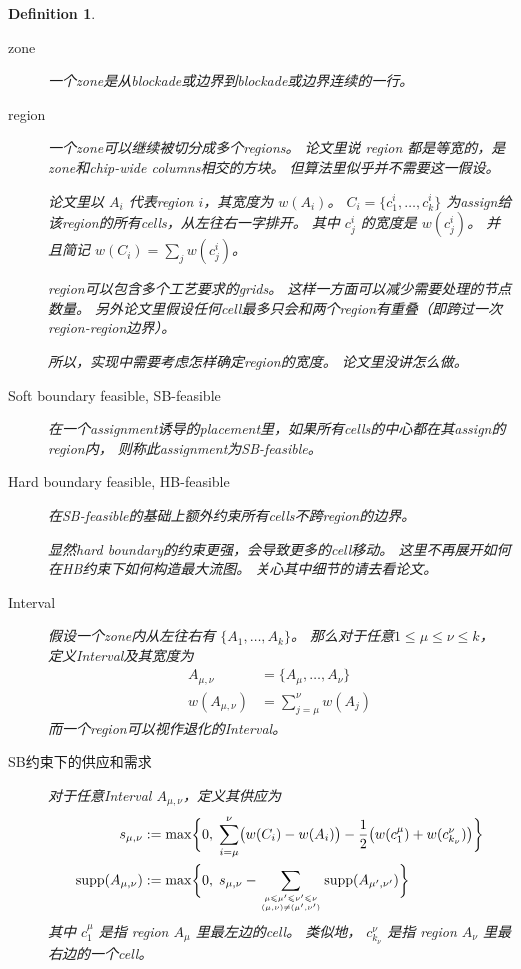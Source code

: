 \documentclass[UTF8,a4paper]{ctexart}
\renewcommand{\leq}{\leqslant}
\newcommand{\supp}[1]{\text{supp} ({#1})}
\renewcommand{\atop}[2]{\genfrac{}{}{0pt}{}{#1}{#2}}
\newtheorem{definition}{Definition}
\begin{document}
\begin{definition}
    \;
    \begin{description}
    \item[zone]
        一个zone是从blockade或边界到blockade或边界连续的一行。
    \item[region]
        一个zone可以继续被切分成多个regions。
        论文里说 region 都是等宽的，是zone和chip-wide columns相交的方块。
        但算法里似乎并不需要这一假设。

        论文里以 $A_i$ 代表region $i$，其宽度为 $w(A_i)$。
        $C_i=\{c^i_1,\dots,c^i_k\}$ 为assign给该region的所有cells，从左往右一字排开。
        其中 $c^i_j$ 的宽度是 $w(c^i_j)$。
        并且简记 $w(C_i)=\sum_j w(c^i_j)$。

        \begin{noteblock}
            region可以包含多个工艺要求的grids。
            这样一方面可以减少需要处理的节点数量。
            另外论文里假设任何cell最多只会和两个region有重叠（即跨过一次region-region边界）。

            所以，实现中需要考虑怎样确定region的宽度。
            论文里没讲怎么做。
        \end{noteblock}
    \item[Soft boundary feasible, SB-feasible]
        在一个assignment诱导的placement里，如果所有cells的中心都在其assign的region内，
        则称此assignment为SB-feasible。
    \item[Hard boundary feasible, HB-feasible]
        在SB-feasible的基础上额外约束所有cells不跨region的边界。

        \begin{noteblock}
            显然hard boundary的约束更强，会导致更多的cell移动。
            这里不再展开如何在HB约束下如何构造最大流图。
            关心其中细节的请去看论文。
        \end{noteblock}
    \item[Interval]
        假设一个zone内从左往右有 $\{A_1,\dots,A_k\}$。
        那么对于任意$1\leq \mu \leq \nu \leq k$，
        定义Interval及其宽度为
        \begin{align*}
            A_{\mu,\nu} &=\{A_\mu,\dots,A_\nu\}\\
            w(A_{\mu,\nu}) &=\sum_{j=\mu}^{\nu} w(A_j)
        \end{align*}
        而一个region可以视作退化的Interval。
    \item[SB约束下的供应和需求]
        对于任意Interval $A_{\mu,\nu}$，定义其供应为
        \begin{align*}
            s_{\mu,\nu} &:=\max\biggl\{%
                0,\;%
                \sum_{i=\mu}^{\nu}\bigl(w(C_i)-w(A_i)\bigr)%
                -\frac{1}{2}\bigl(w(c^{\mu}_1)+w(c^{\nu}_{k_\nu})\bigr)%
            \biggl\}
            \\
            \supp{A_{\mu,\nu}} &:=\max\biggl\{%
                0,\;%
                s_{\mu,\nu}%
                -\sum_{\atop{\mu\leq\mu'\leq\nu'\leq\nu}{(\mu,\nu)\neq(\mu',\nu')}}\supp{A_{\mu',\nu'}}%
            \biggr\}
        \end{align*}
        其中 $c^\mu_1$ 是指 region $A_\mu$ 里最左边的cell。
        类似地， $c^\nu_{k_\nu}$ 是指 region $A_{\nu}$ 里最右边的一个cell。


\end{description}
\end{definition}
\end{document}
